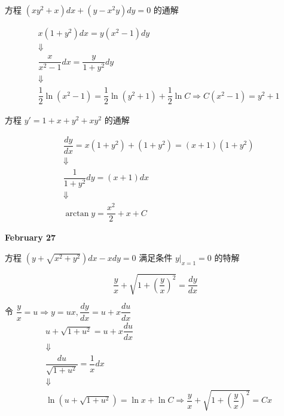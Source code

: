 \begin{example}[][Exam: 28.4.9]
	方程 $(xy^{2}+x)dx+(y-x^{2}y)dy=0$ 的通解
\end{example}
\begin{solution}
	\begin{eqnarray*}
		& x(1+y^{2})dx = y(x^{2}-1)dy\\
		& \Downarrow \\
		& \dfrac{x}{x^{2}-1}dx = \dfrac{y}{1+y^{2}}dy\\
		& \Downarrow \\
		& \dfrac{1}{2}\ln(x^{2}-1) = \dfrac{1}{2}\ln(y^{2}+1) + \dfrac{1}{2}\ln C\Rightarrow C(x^{2}-1) = y^{2}+1
	\end{eqnarray*}
\end{solution}
\begin{example}[][Exam: 28.4.10]
	方程 $y'=1+x+y^{2}+xy^{2}$ 的通解
\end{example}
\begin{solution}
	\begin{eqnarray*}
		& \dfrac{dy}{dx} = x(1+y^{2}) + (1+y^{2}) = (x+1)(1+y^{2})\\
		& \Downarrow \\
		& \dfrac{1}{1+y^{2}}dy = (x+1)dx\\
		& \Downarrow \\
		& \arctan y = \dfrac{x^{2}}{2} + x + C
	\end{eqnarray*}
\end{solution}

\textcolor{purplea}{\textbf{February 27}}

\begin{example}[][Exam: 28.4.11]
	方程 $(y+\sqrt{x^{2}+y^{2}})dx-xdy=0$ 满足条件 $y|_{x=1}=0$ 的特解
\end{example}
\begin{solution}
	$$\dfrac{y}{x}+\sqrt{1+(\dfrac{y}{x})^{2}} = \dfrac{dy}{dx}$$

	令 $\dfrac{y}{x} = u\Rightarrow y = ux, \dfrac{dy}{dx} = u + x\dfrac{du}{dx}$
	\begin{eqnarray*}
		& u + \sqrt{1+u^{2}} = u + x\dfrac{du}{dx}\\
		& \Downarrow \\
		& \dfrac{du}{\sqrt{1+u^{2}}} = \dfrac{1}{x} dx\\
		& \Downarrow \\
		& \ln(u+\sqrt{1+u^{2}}) = \ln x + \ln C\Rightarrow  \dfrac{y}{x} + \sqrt{1+(\dfrac{y}{x})^{2}} = Cx\\
	\end{eqnarray*}
\end{solution}

